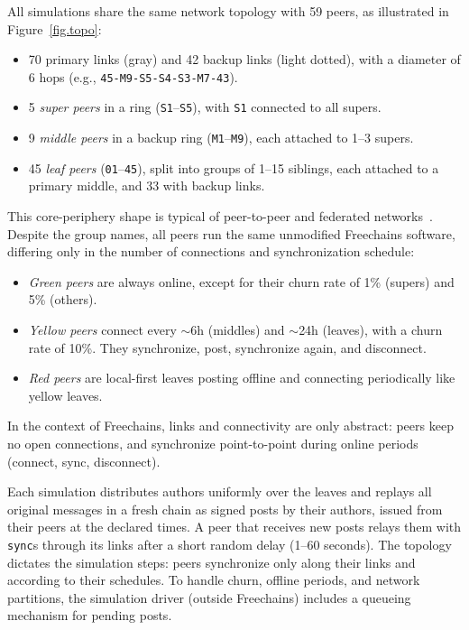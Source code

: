 \documentclass[10pt,twocolumn]{article}
\newcommand{\FC}       {Freechains\xspace}
\newcommand{\code}[1]  {\texttt{\small{#1}}}
\begin{document}
All simulations share the same network topology with 59 peers, as illustrated
in Figure~\ref{fig.topo}:
%
\begin{itemize}
\item
    70 primary links (gray) and 42 backup links (light dotted), with a diameter
    of 6 hops (e.g., \code{45-M9-S5-S4-S3-M7-43}).
\item
    5 \emph{super peers} in a ring (\code{S1}--\code{S5}), with \code{S1}
    connected to all supers.
\item
    9 \emph{middle peers} in a backup ring (\code{M1}--\code{M9}), each
    attached to 1--3 supers.
\item
    45 \emph{leaf peers} (\code{01}--\code{45}), split into groups of 1--15
    siblings, each attached to a primary middle, and 33 with backup links.
\end{itemize}
%
This core-periphery shape is typical of peer-to-peer and federated
networks~\cite{p2p.survey,p2p.overlay,p2p.skype,p2p.monero,p2p.mastodon,p2p.flocking}.
%
Despite the group names, all peers run the same unmodified \FC software,
differing only in the number of connections and synchronization schedule:
%
\begin{itemize}
\item
    \emph{Green peers} are always online, except for their churn rate of 1\%
    (supers) and 5\% (others).
\item
    \emph{Yellow peers} connect every $\sim$6h (middles) and $\sim$24h
    (leaves), with a churn rate of 10\%.
    They synchronize, post, synchronize again, and disconnect.
\item
    \emph{Red peers} are local-first leaves posting offline and connecting
    periodically like yellow leaves.
\end{itemize}
%
In the context of \FC, links and connectivity are only abstract: peers keep no
open connections, and synchronize point-to-point during online periods
(connect, sync, disconnect).

Each simulation distributes authors uniformly over the leaves and replays all
original messages in a fresh chain as signed posts by their authors, issued
from their peers at the declared times.
A peer that receives new posts relays them with \code{sync}s through its
links after a short random delay (1--60 seconds).
The topology dictates the simulation steps: peers synchronize only along their
links and according to their schedules.
To handle churn, offline periods, and network partitions, the simulation
driver (outside \FC) includes a queueing mechanism for pending posts.
\end{document}

